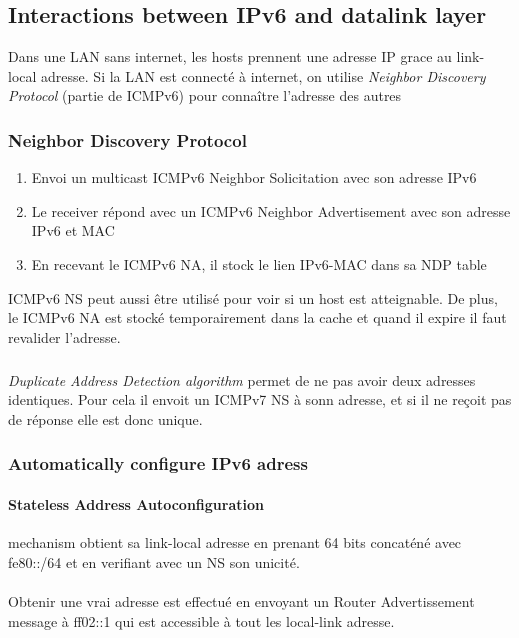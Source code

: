 \documentclass{report}
\begin{document}
\subsection{Interactions between IPv6 and datalink layer}

Dans une LAN sans internet, les hosts prennent une adresse IP grace au link-local adresse.
Si la LAN est connecté à internet, on utilise \textit{Neighbor Discovery Protocol} (partie de ICMPv6) pour connaître l'adresse des autres

\subsubsection{Neighbor Discovery Protocol}

\begin{enumerate}
    \item Envoi un multicast ICMPv6 Neighbor Solicitation avec son adresse IPv6
    \item Le receiver répond avec un ICMPv6 Neighbor Advertisement avec son adresse IPv6 et MAC
    \item En recevant le ICMPv6 NA, il stock le lien IPv6-MAC dans sa NDP table
\end{enumerate}
ICMPv6 NS peut aussi être utilisé pour voir si un host est atteignable. De plus, le ICMPv6 NA est
stocké temporairement dans la cache et quand il expire il faut revalider l'adresse.

\subparagraph{ }
\textit{Duplicate Address Detection algorithm} permet de ne pas avoir deux adresses identiques.
Pour cela il envoit un ICMPv7 NS à sonn adresse, et si il ne reçoit pas de réponse elle est
donc unique.

\subsubsection{Automatically configure IPv6 adress}
\paragraph{Stateless Address Autoconfiguration} mechanism obtient sa link-local adresse
en prenant 64 bits concaténé avec fe80::/64 et en verifiant avec un NS son unicité.

\paragraph{ }
Obtenir  une   vrai  adresse  est   effectué  en  envoyant   un  Router
Advertissement  message  à  ff02::1  qui est  accessible  à  tout  les
local-link adresse.
\end{document}
